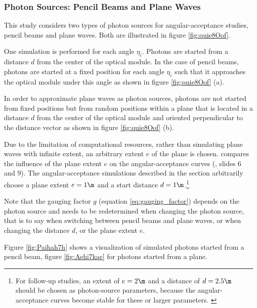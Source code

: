 \subsubsection{Photon Sources: Pencil Beams and Plane Waves}
This study considers two types of photon sources for angular-acceptance studies, pencil beams and plane waves. Both are illustrated in figure \ref{fig:quie8Oof}.

One simulation is performed for each angle $\eta_i$. Photons are started from a distance $d$ from the center of the optical module. In the case of pencil beams, photons are started at a fixed position for each angle $\eta_i$ such that it approaches the optical module under this angle as shown in figure \ref{fig:quie8Oof} (a).

In order to approximate plane waves as photon sources, photons are not started from fixed positions but from random positions within a plane that is located in a distance $d$ from the center of the optical module and oriented perpendicular to the distance vector as shown in figure \ref{fig:quie8Oof} (b).

Due to the limitation of computational resources, rather than simulating plane waves with infinite extent, an arbitrary extent $e$ of the plane is chosen. \rongen \cite{martindardupdate,rongenswedishcamera} compares the influence of the plane extent $e$ on the angular-acceptance curves (\cite{martindardupdate}, slides 6 and 9). The angular-acceptance simulations described in the section arbitrarily choose a plane extent $e = 1\m$ and a start distance $d = 1\m$.\footnote{For follow-up studies, an extent of $e=2\m$ and a distance of $d=2.5\m$ should be chosen as photon-source parameters, because the angular-acceptance curves become stable for these or larger parameters. \cite{rongenswedishcamera}}

Note that the gauging factor $g$ (equation \ref{eq:gauging_factor}) depends on the photon source and needs to be redetermined when changing the photon source, that is to say when switching between pencil beams and plane waves, or when changing the distance $d$, or the plane extent $e$.

Figure \ref{fig:Paihah7h} shows a \steamshovel visualization of simulated photons started from a pencil beam, figure \ref{fig:Aehi7kae} for photons started from a plane.


